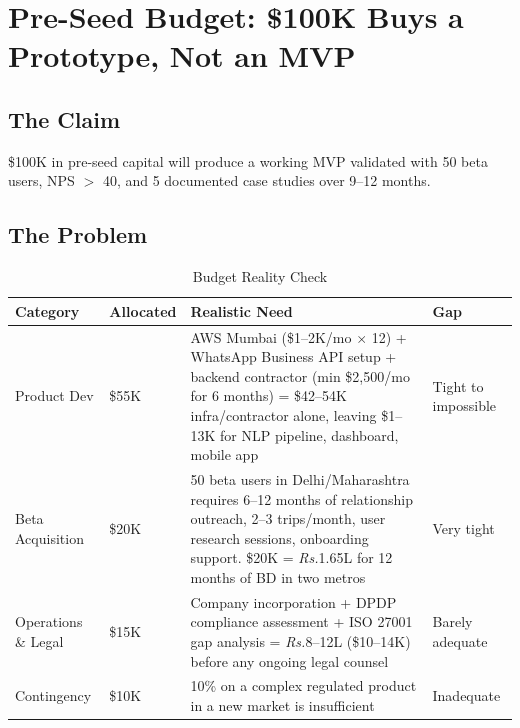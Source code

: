 \documentclass[12pt, a4paper]{article}
\newcommand{\rupee}{\textit{Rs.}}
\begin{document}
\newpage

\section{Pre-Seed Budget: \$100K Buys a Prototype, Not an MVP}

\subsection{The Claim}
\$100K in pre-seed capital will produce a working MVP validated with 50 beta users, NPS $>$ 40, and 5 documented case studies over 9--12 months.

\subsection{The Problem}

\begin{table}[h!]
\centering
\caption{Budget Reality Check}
\renewcommand{\arraystretch}{1.3}
\begin{tabularx}{\textwidth}{lXXX}
\toprule
\rowcolor{rowblue}
\textbf{Category} & \textbf{Allocated} & \textbf{Realistic Need} & \textbf{Gap} \\
\midrule
Product Dev & \$55K & AWS Mumbai (\$1--2K/mo $\times$ 12) + WhatsApp Business API setup + backend contractor (min \$2,500/mo for 6 months) = \$42--54K infra/contractor alone, leaving \$1--13K for NLP pipeline, dashboard, mobile app & Tight to impossible \\
\midrule
Beta Acquisition & \$20K & 50 beta users in Delhi/Maharashtra requires 6--12 months of relationship outreach, 2--3 trips/month, user research sessions, onboarding support. \$20K = \~\rupee{}1.65L for 12 months of BD in two metros & Very tight \\
\midrule
Operations \& Legal & \$15K & Company incorporation + DPDP compliance assessment + ISO 27001 gap analysis = \rupee{}8--12L (\$10--14K) before any ongoing legal counsel & Barely adequate \\
\midrule
Contingency & \$10K & 10\% on a complex regulated product in a new market is insufficient & Inadequate \\
\bottomrule
\end{tabularx}
\end{table}
\end{document}
